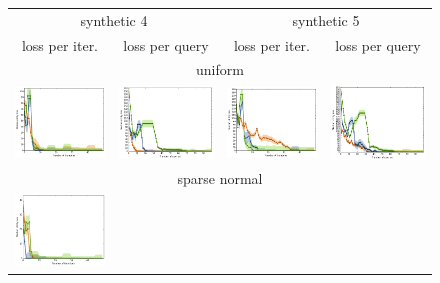 \documentclass{article}
\renewcommand\[{\begin{equation}}
\renewcommand\]{\end{equation}}
\begin{document}
\begin{figure}[b]
    \centering
    {\footnotesize
    \begin{tabular}{cccc}
        \hline
        \multicolumn{2}{c}{{\sc synthetic 4}} &
        \multicolumn{2}{c}{{\sc synthetic 5}}
        \\
        {\sc loss per iter.} & {\sc loss per query} & {\sc loss per iter.} & {\sc loss per query}
        \\
        \hline \hline
        \multicolumn{4}{c}{{\sc uniform}}
        \\
        \includegraphics[width=10em]{figures/synthetic_vs_self_4_uniform_per_iter_loss} &
        \includegraphics[width=10em]{figures/synthetic_vs_self_4_uniform_per_query_loss} &
        \includegraphics[width=10em]{figures/synthetic_vs_self_5_uniform_per_iter_loss} &
        \includegraphics[width=10em]{figures/synthetic_vs_self_5_uniform_per_query_loss}
        \\
        \hline
        \multicolumn{4}{c}{{\sc sparse normal}}
        \\
        \includegraphics[width=10em]{figures/synthetic_vs_self_4_normal_sparse_per_iter_loss} &

\end{tabular}}
\end{figure}
\end{document}
